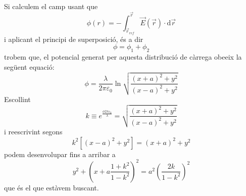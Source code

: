 \documentclass[a4paper,10.5pt]{report}
\begin{document}
\begin{appendices}
Si calculem el camp usant que
\begin{equation}
	\phi(r) = -\int_{\vec{r}_{ref}}^{\vec{r}}\vec{E}(\vec{r})\cdot \mathrm{d}\vec{r} 
\end{equation}
i aplicant el principi de superposició, és a dir
\begin{equation}
	\phi = \phi_1+\phi_2
\end{equation}
trobem que, el potencial generat per aquesta distribució de càrrega obeeix la següent equació:
\begin{equation}
	\phi = \frac{\lambda}{2\pi \varepsilon_0}\ln\sqrt{\frac{(x+a)^2+y^2}{(x-a)^2+y^2}}
\end{equation}
Escollint
\begin{equation}
	k \equiv e^{\frac{\phi2\pi\varepsilon_0}{\lambda}} = \sqrt{\frac{(x+a)^2+y^2}{(x-a)^2+y^2}}
\end{equation}
i reescrivint segons
\begin{equation}
	k^2[(x-a)^2+y^2]=(x+a)^2+y^2
\end{equation}  
podem desenvolupar fins a arribar a
\begin{equation}
	\boxed{y^2+\left( x+a\frac{1+k^2}{1-k^2}\right)^2 = a^2\left( \frac{2k}{1-k^2}\right)^2}
\end{equation}
que és el que estàvem buscant.

\newpage

\end{appendices}
\end{document}
